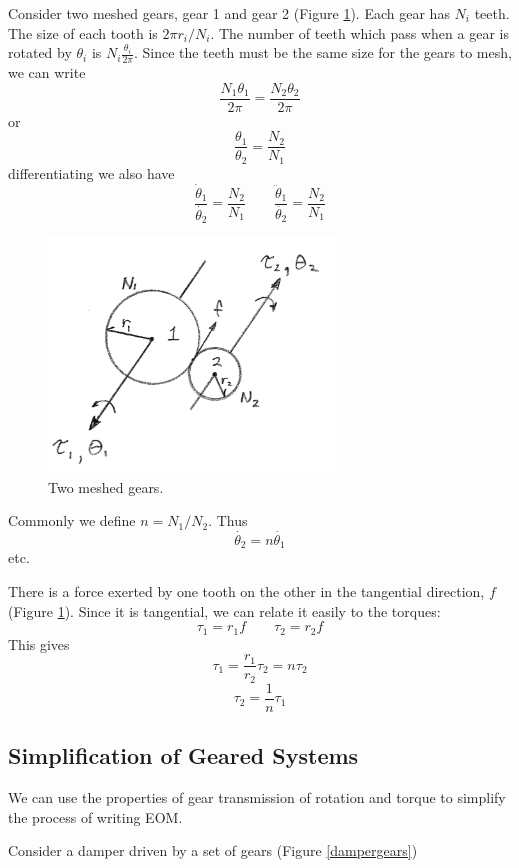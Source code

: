 Consider two meshed gears, gear 1 and gear 2 (Figure \ref{2meshedgears}).
Each gear has $N_i$ teeth.
The size of each tooth is $2\pi r_i/ N_i$.  The number of teeth which pass when a gear is rotated by $\theta_i$ is $N_i\frac{\theta_i}{2\pi}$.
Since the teeth must be the same size for the gears to mesh, we can write
\[
\frac{N_1\theta_1}{2\pi} = \frac{N_2\theta_2}{2\pi}
\]
or
\[
\frac {\theta_1}{\theta_2}  =  \frac{N_2}{N_1}
\]
differentiating we also have
\[
\frac { \dot{\theta}_1}{ \dot{\theta_2}}  =  \frac{N_2}{N_1} \qquad
\frac {\ddot{\theta}_1}{\ddot{\theta_2}}  =  \frac{N_2}{N_1}
\]

\begin{figure}\centering
\includegraphics[width=3.0in]{figs03/00744a.png}
\caption{Two meshed gears.}\label{2meshedgears}
\end{figure}

Commonly we define $n  = N_1/N_2$.   Thus
\[
\dot{\theta_2} = n \dot{\theta_1}
\]
etc.


There is a force exerted by one tooth on the other in the tangential direction, $f$ (Figure \ref{2meshedgears}).  Since it is tangential, we can relate it easily to the torques:
\[
\tau_1 = r_1f \qquad \tau_2 = r_2f
\]
This gives
\[
\tau_1 = \frac{r_1}{r_2}\tau_2 = n\tau_2
\]
\[
\tau_2 = \frac{1}{n} \tau_1
\]

\subsection{Simplification of Geared Systems}

We can use the properties of gear transmission of rotation and torque to simplify the process of writing EOM.

Consider a damper driven by a set of gears (Figure \ref{dampergears})

